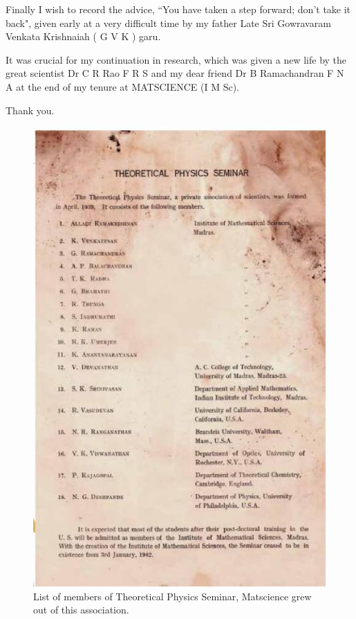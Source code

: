 Finally I wish to record the advice, ``You have taken a step forward; don’t take it
back", given early at a very difficult time by my father Late Sri Gowravaram Venkata
Krishnaiah ( G V K ) garu.

It was crucial for my continuation in research, which was given a new life by the
great scientist Dr C R Rao F R S and my dear friend Dr B Ramachandran F N A at
the end of my tenure at MATSCIENCE (I M Sc).

Thank you.

\begin{figure}[H]
\centering
\includegraphics[scale=0.65]{src/images/chap25/1.eps}
\caption{List of members of Theoretical Physics Seminar, Matscience grew out of
this association.}
\end{figure}


